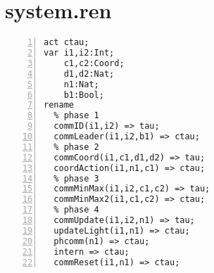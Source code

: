 \section*{system.ren}

\begin{Verbatim}[frame=lines,numbers=left,fontfamily=courier,fontsize=\footnotesize]
act ctau;
var i1,i2:Int;
    c1,c2:Coord;
    d1,d2:Nat;
    n1:Nat;
    b1:Bool;
rename
  % phase 1
  commID(i1,i2) => tau;
  commLeader(i1,i2,b1) => ctau;
  % phase 2
  commCoord(i1,c1,d1,d2) => tau;
  coordAction(i1,n1,c1) => ctau;
  % phase 3
  commMinMax(i1,i2,c1,c2) => tau;
  commMinMax2(i1,c1,c2) => ctau;
  % phase 4
  commUpdate(i1,i2,n1) => tau;
  updateLight(i1,n1) => ctau;
  phcomm(n1) => ctau;
  intern => ctau;
  commReset(i1,n1) => ctau;
\end{Verbatim}
